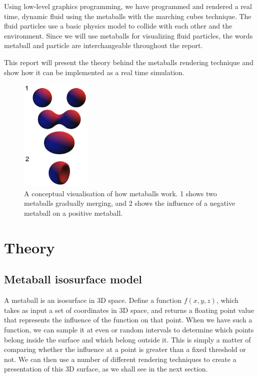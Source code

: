 \documentclass{article}
\begin{document}
\begin{multicols}{2}
		Using low-level graphics programming, we have programmed and rendered a real time, dynamic fluid using the metaballs with the marching cubes technique. The fluid particles use a basic physics model to collide with each other and the environment. Since we will use metaballs for visualizing fluid particles, the words metaball and particle are interchangeable throughout the report.
	
	    This report will present the theory behind the metaballs rendering technique and show how it can be implemented as a real time simulation. 
    
	    \begin{figure}[H]
	    	\centering
	    	\begin{minipage}[b]{0.5\textwidth}
	    		\centering
	    		\includegraphics[width=0.3\textwidth]{img/metaballs-concept.png}
	    		\caption{A conceptual visualisation of how metaballs work. 1 shows two metaballs gradually merging, and 2 shows the influence of a negative metaball on a positive metaball. \cite{wiki07}}
	    		\label{fig:metaballs-concept}
	    	\end{minipage}
	    \end{figure}

    \section{Theory}

        \subsection{Metaball isosurface model}
            A metaball is an isosurface in 3D space. 
            Define a function $f(x,y,z)$, which takes as input a set of coordinates in 3D space, and returns a floating point value that represents the influence of the function on that point.
            When we have such a function, we can sample it at even or random intervals to determine which points belong inside the surface and which belong outside it.
            This is simply a matter of comparing whether the influence at a point is greater than a fixed threshold or not.
            We can then use a number of different rendering techniques to create a presentation of this 3D surface, as we shall see in the next section.


\end{multicols}
\end{document}
